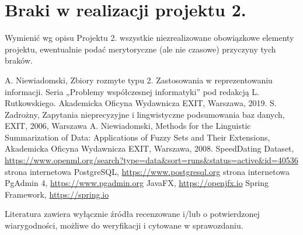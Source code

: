\documentclass{classrep}
\begin{document}
\section{Braki w realizacji projektu 2.}
Wymienić wg opisu Projektu 2. wszystkie niezrealizowane obowiązkowe elementy projektu, ewentualnie
podać merytoryczne (ale nie czasowe) przyczyny tych braków. 


\begin{thebibliography}{99}
  A. Niewiadomski, Zbiory rozmyte typu 2. Zastosowania w reprezentowaniu informacji.  Seria „Problemy współczesnej informatyki” pod redakcją L. Rutkowskiego. Akademicka Oficyna Wydawnicza EXIT, Warszawa, 2019.
 S. Zadrożny, Zapytania nieprecyzyjne i lingwistyczne podsumowania baz danych, EXIT, 2006, Warszawa
 A. Niewiadomski, Methods for the Linguistic Summarization of Data: Applications of Fuzzy Sets and Their Extensions, Akademicka Oficyna Wydawnicza EXIT, Warszawa, 2008.
 SpeedDating Dataset, \url{https://www.openml.org/search?type=data&sort=runs&status=active&id=40536}
 strona internetowa PostgreSQL, \url{https://www.postgresql.org}
 strona internetowa PgAdmin 4, \url{https://www.pgadmin.org}
 JavaFX, \url{https://openjfx.io}
 Spring Framework, \url{https://spring.io}

\end{thebibliography}

Literatura zawiera wyłącznie źródła recenzowane i/lub o potwierdzonej wiarygodności,
możliwe do weryfikacji i cytowane w sprawozdaniu. 
\end{document}
